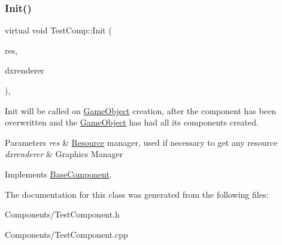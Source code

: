 \subsubsection{\texorpdfstring{Init()}{Init()}}
{\footnotesize\ttfamily virtual void Test\+Comp\+::\+Init (\begin{DoxyParamCaption}\item[{\hyperlink{classResourceManager}{Resource\+Manager} $\ast$}]{res,  }\item[{\hyperlink{classDXRenderer}{D\+X\+Renderer} $\ast$}]{dxrenderer }\end{DoxyParamCaption})\hspace{0.3cm}{\ttfamily [override]}, {\ttfamily [virtual]}}



Init will be called on \hyperlink{classGameObject}{Game\+Object} creation, after the component has been overwritten and the \hyperlink{classGameObject}{Game\+Object} has had all its components created. 


\begin{DoxyParams}{Parameters}
{\em res} & \hyperlink{structResource}{Resource} manager, used if necessary to get any resource \\
\hline
{\em dxrenderer} & Graphic\textquotesingle{}s Manager \\
\hline
\end{DoxyParams}


Implements \hyperlink{classBaseComponent}{Base\+Component}.



The documentation for this class was generated from the following files\+:\begin{DoxyCompactItemize}
\item 
Components/Test\+Component.\+h\item 
Components/Test\+Component.\+cpp\end{DoxyCompactItemize}

